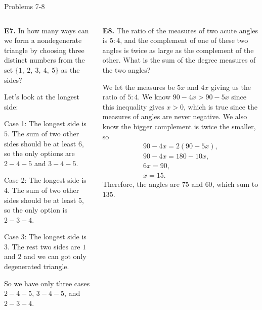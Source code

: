 \documentclass[9pt,aspectratio=169]{beamer}
\begin{document}
\begin{frame}{Problems 7-8}
  \begin{columns}[T]
    \begin{column}{0.5\textwidth}
      \begin{problem}
        \textbf{E7.} In how many ways can we form a nondegenerate triangle by choosing three distinct
        numbers from the set $\{1,\ 2,\ 3,\ 4,\ 5\}$ as the sides?
      \end{problem}\pause
      Let's look at the longest side: 

      Case 1: The longest side is $5$. The sum of two other sides should be at least $6$, so the only options are $2-4-5$ and $3-4-5$.

      Case 2: The longest side is $4$. The sum of two other sides should be at least $5$, so the only option is $2-3-4$.

      Case 3: The longest side is $3$. The rest two sides are $1$ and $2$ and we can got only degenerated triangle.

      So we have only three cases $2-4-5$, $3-4-5$, and $2-3-4$.\pause
    \end{column}
    \begin{column}{0.5\textwidth}
      \begin{problem}
        \textbf{E8.} The ratio of the measures of two acute angles is $5:4$, and the complement of one of these two angles is twice as large as the complement of the other. What is the sum of the degree measures of the two angles?
      \end{problem}\pause
      We let the measures be $5x$ and $4x$ giving us the ratio of $5:4$. We know $90-4x>90-5x$ since this inequality gives $x>0$, which is true since the measures of angles are never negative. We also know the bigger complement is twice the smaller, so
      \begin{gather*}
        90-4x=2(90-5x),\\
        90-4x=180-10x,\\
        6x=90,\\
        x=15.
      \end{gather*}
      Therefore, the angles are $75$ and $60$, which sum to $\boxed{135}$.
    \end{column}
  \end{columns}
\end{frame}
\end{document}
